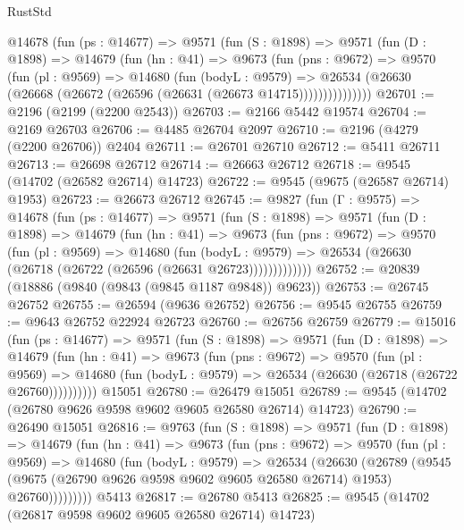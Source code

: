 \begin{lexlean}{RustStd}
\begin{coremodule}
      @14678
        (fun (ps : @14677) =>
        @9571
          (fun (S : @1898) =>
          @9571
            (fun (D : @1898) =>
            @14679
              (fun (hn : @41) =>
              @9673
                (fun (pns : @9672) =>
                @9570
                  (fun (pl : @9569) =>
                  @14680
                    (fun (bodyL : @9579) =>
                    @26534 (@26630 (@26668 (@26672 (@26596 (@26631 (@26673 @14715)))))))))))))))
@26701 := @2196 (@2199 (@2200 @2543))
@26703 := @2166 @5442 @19574
@26704 := @2169 @26703
@26706 := @4485 @26704 @2097
@26710 := @2196 (@4279 (@2200 @26706)) @2404
@26711 := @26701 @26710
@26712 := @5411 @26711
@26713 := @26698 @26712
@26714 := @26663 @26712
@26718 := @9545 (@14702 (@26582 @26714) @14723)
@26722 := @9545 (@9675 (@26587 @26714) @1953)
@26723 := @26673 @26712
@26745 := @9827
    (fun (Γ : @9575) =>
    @14678
      (fun (ps : @14677) =>
      @9571
        (fun (S : @1898) =>
        @9571
          (fun (D : @1898) =>
          @14679
            (fun (hn : @41) =>
            @9673
              (fun (pns : @9672) =>
              @9570
                (fun (pl : @9569) =>
                @14680
                  (fun (bodyL : @9579) =>
                  @26534 (@26630 (@26718 (@26722 (@26596 (@26631 @26723)))))))))))))
@26752 := @20839 (@18886 (@9840 (@9843 (@9845 @1187 @9848)) @9623))
@26753 := @26745 @26752
@26755 := @26594 (@9636 @26752)
@26756 := @9545 @26755
@26759 := @9643 @26752 @22924 @26723
@26760 := @26756 @26759
@26779 := @15016
    (fun (ps : @14677) =>
    @9571
      (fun (S : @1898) =>
      @9571
        (fun (D : @1898) =>
        @14679
          (fun (hn : @41) =>
          @9673
            (fun (pns : @9672) =>
            @9570
              (fun (pl : @9569) =>
              @14680 (fun (bodyL : @9579) => @26534 (@26630 (@26718 (@26722 @26760))))))))))
    @15051
@26780 := @26479 @15051
@26789 := @9545 (@14702 (@26780 @9626 @9598 @9602 @9605 @26580 @26714) @14723)
@26790 := @26490 @15051
@26816 := @9763
    (fun (S : @1898) =>
    @9571
      (fun (D : @1898) =>
      @14679
        (fun (hn : @41) =>
        @9673
          (fun (pns : @9672) =>
          @9570
            (fun (pl : @9569) =>
            @14680
              (fun (bodyL : @9579) =>
              @26534
                (@26630
                  (@26789
                    (@9545
                      (@9675 (@26790 @9626 @9598 @9602 @9605 @26580 @26714) @1953)
                      @26760)))))))))
    @5413
@26817 := @26780 @5413
@26825 := @9545 (@14702 (@26817 @9598 @9602 @9605 @26580 @26714) @14723)

\end{coremodule}
\end{lexlean}
